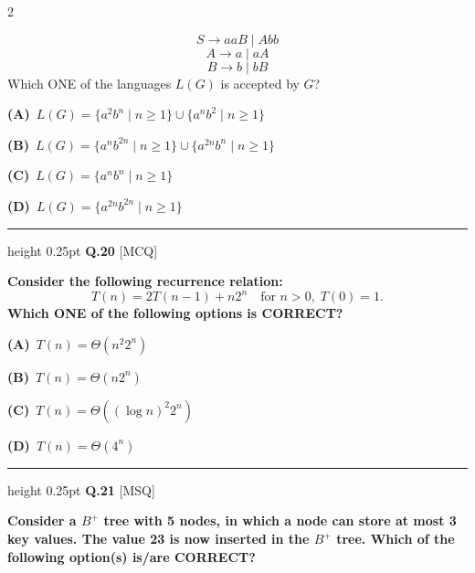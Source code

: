 \documentclass[a4paper,10pt,twoside]{article}
\begin{document}
\begin{multicols}{2}
{\[ S \to aaB \mid Abb \]
\[ A \to a \mid aA \]
\[ B \to b \mid bB \]
Which ONE of the languages $L(G)$ is accepted by $G$? \par}
\par\vspace{2pt}\noindent
\textbf{(A)}~$L(G) = \{a^2b^n \mid n \ge 1\} \cup \{a^nb^2 \mid n \ge 1\}$\par\vspace{2pt}\noindent
\textbf{(B)}~$L(G) = \{a^nb^{2n} \mid n \ge 1\} \cup \{a^{2n}b^n \mid n \ge 1\}$\par\vspace{2pt}\noindent
\textbf{(C)}~$L(G) = \{a^nb^n \mid n \ge 1\}$\par\vspace{2pt}\noindent
\textbf{(D)}~$L(G) = \{a^{2n}b^{2n} \mid n \ge 1\}$
\par\vspace{6pt}\hrule height 0.25pt\vspace{6pt}
\noindent\textbf{Q.20} \hfill {\footnotesize\textsf{[MCQ]}}
\par\vspace{2pt}
{\bfseries Consider the following recurrence relation:
\[ T(n) = 2T(n-1) + n2^n \quad \text{for } n > 0, \; T(0) = 1. \]
Which ONE of the following options is CORRECT? \par}
\par\vspace{2pt}\noindent
\textbf{(A)}~$T(n) = \Theta(n^2 2^n)$\par\vspace{2pt}\noindent
\textbf{(B)}~$T(n) = \Theta(n 2^n)$\par\vspace{2pt}\noindent
\textbf{(C)}~$T(n) = \Theta((\log n)^2 2^n)$\par\vspace{2pt}\noindent
\textbf{(D)}~$T(n) = \Theta(4^n)$
\par\vspace{6pt}\hrule height 0.25pt\vspace{6pt}
\noindent\textbf{Q.21} \hfill {\footnotesize\textsf{[MSQ]}}
\par\vspace{2pt}
{\bfseries Consider a $B^+$ tree with 5 nodes, in which a node can store at most 3 key values. The value 23 is now inserted in the $B^+$ tree. Which of the following option(s) is/are CORRECT? \par}
\par\vspace{2pt}\noindent

\end{multicols}
\end{document}
